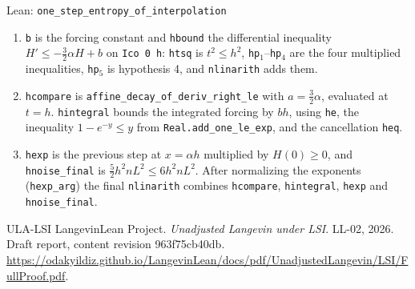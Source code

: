 \documentclass[11pt,a4paper]{article}
\begin{document}
\begin{leanbox}{Lean: \texttt{one\_\allowbreak{}step\_\allowbreak{}entropy\_\allowbreak{}of\_\allowbreak{}interpolation}}
\begin{enumerate}
\item \texttt{b} is the forcing constant and \texttt{hbound} the differential inequality \(H'\le-\frac32\alpha H+b\) on \texttt{Ico 0 h}: \texttt{htsq} is \(t^2\le h^2\), \texttt{hp\ensuremath{{}_{1}}}–\texttt{hp\ensuremath{{}_{4}}} are the four multiplied inequalities, \texttt{hp\ensuremath{{}_{5}}} is hypothesis 4, and \texttt{nlinarith} adds them.

\item \texttt{hcompare} is \texttt{affine\_\allowbreak{}decay\_\allowbreak{}of\_\allowbreak{}deriv\_\allowbreak{}right\_\allowbreak{}le} with \(a=\frac32\alpha\), evaluated at \(t=h\). \texttt{hintegral} bounds the integrated forcing by \(bh\), using \texttt{he}, the inequality \(1-e^{-y}\le y\) from \texttt{Real.\allowbreak{}add\_\allowbreak{}one\_\allowbreak{}le\_\allowbreak{}exp}, and the cancellation \texttt{heq}.

\item \texttt{hexp} is the previous step at \(x=\alpha h\) multiplied by \(H(0)\ge0\), and \texttt{hnoise\_\allowbreak{}final} is \(\frac52h^2nL^2\le6h^2nL^2\). After normalizing the exponents (\texttt{hexp\_\allowbreak{}arg}) the final \texttt{nlinarith} combines \texttt{hcompare}, \texttt{hintegral}, \texttt{hexp} and \texttt{hnoise\_\allowbreak{}final}.

\end{enumerate}
\end{leanbox}

\begin{thebibliography}{ULA-LSI}
LangevinLean Project. \emph{Unadjusted Langevin under LSI}. LL-02, 2026. Draft report, content revision 963f75cb40db. \url{https://odakyildiz.github.io/LangevinLean/docs/pdf/UnadjustedLangevin/LSI/FullProof.pdf}.
\end{thebibliography}
\end{document}
